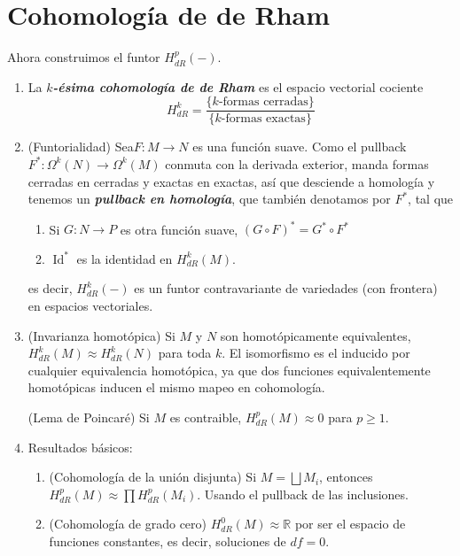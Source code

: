 \documentclass[spanish]{article}
\theoremstyle{definition}
\newcommand{\R}{\mathbb{R}}
\DeclareMathOperator{\Id}{Id}
\begin{document}
	\section{Cohomología de de Rham}\label{sec:3}
	Ahora construimos el funtor $H_{dR}^p(-)$.
	\begin{enumerate}
		\item La \textbf{\textit{$k$-ésima cohomología de de Rham}} es el espacio vectorial cociente
		\[H_{dR}^k=\frac{\{k\text{-formas cerradas}\}}{\{k\text{-formas exactas}\}}\]
		
		\item (Funtorialidad) Sea$F:M\to N$ es una función suave. Como el pullback $F^*:\Omega^k(N)\to\Omega^k(M)$ conmuta con la derivada exterior, manda formas cerradas en cerradas y exactas en exactas, así que desciende a homología y tenemos un \textbf{\textit{pullback en homología}}, que también denotamos por $F^*$, tal que
		\begin{enumerate}
			\item Si $G:N\to P$ es otra función suave, $(G\circ F)^*=G^*\circ F^*$
			\item $\Id^*$ es la identidad en $H_{dR}^k(M)$.
		\end{enumerate}
		es decir, $H_{dR}^k(-)$ es un funtor contravariante de variedades (con frontera) en espacios vectoriales.
		
		\item (Invarianza homotópica) Si $M$ y $N$ son homotópicamente equivalentes, $H_{dR}^k(M)\approx H_{dR}^k(N)$ para toda $k$. El isomorfismo es el inducido por cualquier equivalencia homotópica, ya que dos funciones equivalentemente homotópicas inducen el mismo mapeo en cohomología.
		
		(Lema de Poincaré) Si $M$ es contraible, $H_{dR}^p(M)\approx0$ para $p\geq1$.
		
		\item Resultados básicos:
		\begin{enumerate}
			\item (Cohomología de la unión disjunta) Si $M=\bigsqcup M_i$, entonces $H_{dR}^p(M)\approx \prod H_{dR}^p(M_i)$. Usando el pullback de las inclusiones.
			
			\item (Cohomología de grado cero) $H_{dR}^0(M)\approx\R$ por ser el espacio de funciones constantes, es decir, soluciones de $df=0$.
			

\end{enumerate}
\end{enumerate}
\end{document}
